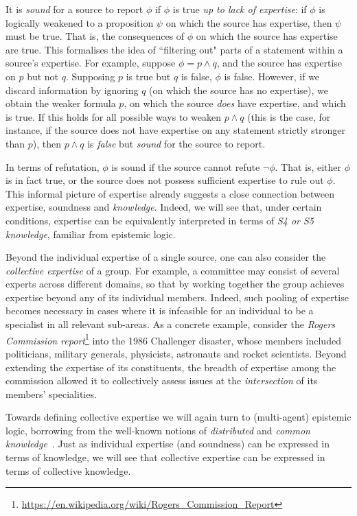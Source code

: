 It is \emph{sound} for a source to report $\phi$ if $\phi$ is true \emph{up to
lack of expertise}: if $\phi$ is logically weakened to a proposition $\psi$ on
which the source has expertise, then $\psi$ must be true. That is, the
consequences of $\phi$ on which the source has expertise are true.
%
This formalises the idea of ``filtering out" parts of a statement within a
source's expertise. For example, suppose $\phi = p \land q$, and the source has
expertise on $p$ but not $q$. Supposing $p$ is true but $q$ is false, $\phi$ is
false. However, if we discard information by ignoring $q$ (on which the source
has no expertise), we obtain the weaker formula $p$, on which the source
\emph{does} have expertise, and which is true. If this holds for all possible
ways to weaken $p \land q$ (this is the case, for instance, if the source does
not have expertise on any statement strictly stronger than $p$), then $p \land
q$ is \emph{false} but \emph{sound} for the source to report.

In terms of refutation, $\phi$ is sound if the source cannot refute $\neg\phi$.
That is, either $\phi$ is in fact true, or the source does not possess
sufficient expertise to rule out $\phi$.
%
This informal picture of expertise already suggests a close connection between
expertise, soundness and \emph{knowledge}. Indeed, we will see that, under
certain conditions, expertise can be equivalently interpreted in terms of
\emph{S4 or S5 knowledge}, familiar from epistemic logic.

Beyond the individual expertise of a single source, one can also consider the
\emph{collective expertise} of a group. For example, a committee may consist of
several experts across different domains, so that by working together the group
achieves expertise beyond any of its individual members. Indeed, such pooling
of expertise becomes necessary in cases where it is infeasible for an
individual to be a specialist in all relevant sub-areas. As a concrete example,
consider the \emph{Rogers Commission
report}\footnote{\url{https://en.wikipedia.org/wiki/Rogers_Commission_Report}}
into the 1986 Challenger disaster, whose members included politicians, military
generals, physicists, astronauts and rocket scientists. Beyond extending the
expertise of its constituents, the breadth of expertise among the commission
allowed it to collectively assess issues at the \emph{intersection} of its
members' specialities.

Towards defining collective expertise we will again turn to (multi-agent)
epistemic logic, borrowing from the well-known notions of \emph{distributed}
and \emph{common knowledge}~\citep{fagin2003reasoning}. Just as individual
expertise (and soundness) can be expressed in terms of knowledge, we will see
that collective expertise can be expressed in terms of collective knowledge.

